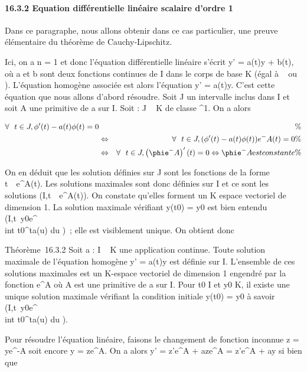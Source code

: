 \paragraph{16.3.2 Equation différentielle linéaire scalaire d'ordre 1}

Dans ce paragraphe, nous allons obtenir dans ce cas particulier, une
preuve élémentaire du théorème de Cauchy-Lipschitz.

Ici, on a n = 1 et donc l'équation différentielle linéaire s'écrit y' =
a(t)y + b(t), où a et b sont deux fonctions continues de I dans le corps
de base K (égal à ~ ou ). L'équation homogène associée est alors
l'équation y' = a(t)y. C'est cette équation que nous allons d'abord
résoudre. Soit J un intervalle inclus dans I et soit A une primitive de
a sur I. Soit \phi : J \rightarrow~ K de classe ^1. On a alors

\begin{align*} \forall~~t \in J,
\phi'(t) - a(t)\phi(t) = 0&& \%& \\ &
\Leftrightarrow & \forall~~t \in J, (\phi'(t)
- a(t)\phi(t))e^-A(t) = 0 \%& \\
& \Leftrightarrow & \forall~~t \in J,
\left (\phie^-A\right )'(t) = 0
\Leftrightarrow \phie^-A\text est
constante\%& \\
\end{align*}

On en déduit que les solution définies sur J sont les fonctions de la
forme t\mapsto~\lambda~e^A(t). Les solutions
maximales sont donc définies sur I et ce sont les solutions
(I,t\mapsto~\lambda~e^A(t)). On constate
qu'elles forment un K espace vectoriel de dimension 1. La solution
maximale vérifiant y(t0) = y0 est bien entendu
(I,t\mapsto~y0e^\\int
 t0^ta(u) du )~; elle est visiblement
unique. On obtient donc

Théorème~16.3.2 Soit a : I \rightarrow~ K une application continue. Toute solution
maximale de l'équation homogène y' = a(t)y est définie sur I. L'ensemble
de ces solutions maximales est un K-espace vectoriel de dimension 1
engendré par la fonction e^A où A est une primitive de a sur
I. Pour t0 \in I et y0 \in K, il existe une unique
solution maximale vérifiant la condition initiale y(t0) =
y0 à savoir
(I,t\mapsto~y0e^\\int
 t0^ta(u) du ).

Pour résoudre l'équation linéaire, faisons le changement de fonction
inconnue z = ye^-A soit encore y = ze^A. On a
alors y' = z'e^A + aze^A = z'e^A + ay
si bien que


